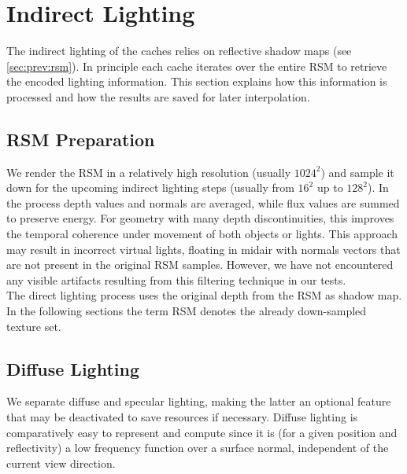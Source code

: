 \documentclass[thesis.tex]{subfiles}
\begin{document}
\section{Indirect Lighting}
The indirect lighting of the caches relies on reflective shadow maps (see \autoref{sec:prev:rsm}).
In principle each cache iterates over the entire RSM to retrieve the encoded lighting information.
This section explains how this information is processed and how the results are saved for later interpolation.

\subsection{RSM Preparation} \label{sec:impl:rsmprep}
We render the RSM in a relatively high resolution (usually $1024^2$) and sample it down for the upcoming indirect lighting steps (usually from $16^2$ up to $128^2$).
In the process depth values and normals are averaged, while flux values are summed to preserve energy.
For geometry with many depth discontinuities, this improves the temporal coherence under movement of both objects or lights.
This approach may result in incorrect virtual lights, floating in midair with normals vectors that are not present in the original RSM samples.
However, we have not encountered any visible artifacts resulting from this filtering technique in our tests.
\\
The direct lighting process uses the original depth from the RSM as shadow map.
In the following sections the term RSM denotes the already down-sampled texture set.

\subsection{Diffuse Lighting} \label{sec:impl:diffuse}
We separate diffuse and specular lighting, making the latter an optional feature that may be deactivated to save resources if necessary.
Diffuse lighting is comparatively easy to represent and compute since it is (for a given position and reflectivity) a low frequency function over a surface normal, independent of the current view direction.

\end{document}
